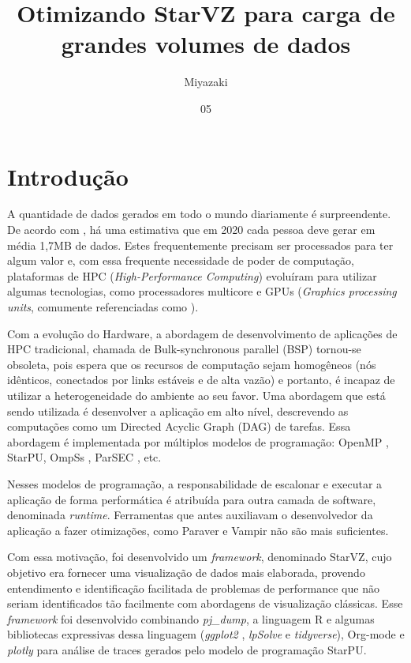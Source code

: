 \documentclass[prop-esp]{iiufrgs}
\title{Otimizando StarVZ para carga de grandes volumes de dados}
\author{Miyazaki}{Alexandre K. S.}
\date{05}{2019}
\begin{document}
\maketitle      



%
\chapter{Introdução} \label{intro}

A quantidade de dados gerados em todo o mundo diariamente é surpreendente. De acordo com \cite{}, há uma estimativa
que em 2020 cada pessoa deve gerar em média 1,7MB de dados. Estes frequentemente precisam ser processados para ter algum valor e,
com essa frequente necessidade de poder de computação, plataformas de HPC (\emph{High-Performance Computing}) evoluíram para utilizar algumas
tecnologias, como processadores multicore e GPUs (\emph{Graphics processing units}, comumente referenciadas como ).

Com a evolução do Hardware, a abordagem de desenvolvimento de aplicações de HPC tradicional, chamada de Bulk-synchronous parallel (BSP) tornou-se 
obsoleta, pois espera que os recursos de computação sejam homogêneos (nós idênticos, conectados por links estáveis e de alta vazão) e portanto, é incapaz de utilizar a heterogeneidade do ambiente ao seu favor. Uma abordagem que está sendo utilizada é desenvolver a aplicação em alto nível, descrevendo as computações como um Directed Acyclic Graph (DAG) de tarefas. Essa abordagem é implementada por múltiplos modelos de programação: OpenMP \cite{}, StarPU, OmpSs \cite{}, ParSEC \cite{}, etc. 

Nesses modelos de programação, a responsabilidade de escalonar e executar a aplicação de forma performática é atribuída para outra camada de software, denominada \emph{runtime}. Ferramentas que antes auxiliavam o desenvolvedor da aplicação a fazer otimizações, como Paraver \cite{} e Vampir \cite{}
não são mais suficientes.

Com essa motivação, foi desenvolvido um \emph{framework}, denominado StarVZ, cujo objetivo era fornecer uma visualização de dados mais elaborada, provendo entendimento e identificação facilitada de problemas de performance que não seriam identificados tão facilmente com abordagens de visualização clássicas. Esse \emph{framework} foi desenvolvido combinando \emph{pj\_dump},  a linguagem R \cite{} e algumas bibliotecas expressivas dessa linguagem (\emph{ggplot2} \cite{}, \emph{lpSolve} \cite{} e \emph{tidyverse}), Org-mode \cite{} e \emph{plotly} para análise de traces gerados pelo modelo de programação StarPU.
\end{document}
